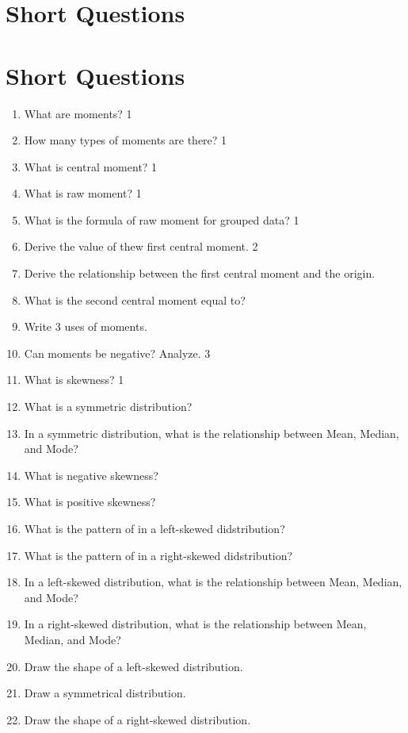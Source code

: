 \documentclass[a4paper,oneside]{book}
\begin{document}
\section{Short Questions}

\section{Short Questions}
\begin{enumerate}
    \item What are moments? \hfill 1
    \item How many types of moments are there?  \hfill 1
    \item What is central moment? \hfill 1
    \item  What is raw moment? \hfill 1
    \item  What is the formula of raw moment for grouped data? \hfill 1
    \item Derive the value of thew first central moment. \hfill 2
    \item  Derive the relationship between the first central moment and the origin.
    \item What is the second central moment equal to?
    \item Write 3 uses of moments.
    \item Can moments be negative? Analyze. \hfill 3
    \item What is skewness? \hfill 1
    \item What is a symmetric distribution?
    \item In a symmetric distribution, what is the relationship between Mean, Median, and Mode?
    \item What is negative skewness?
    \item What is positive skewness?
    \item What is the pattern of in a left-skewed didstribution?
    \item What is the pattern of in a right-skewed didstribution?
    \item In a left-skewed distribution, what is the relationship between Mean, Median, and Mode?
    \item In a right-skewed distribution, what is the relationship between Mean, Median, and Mode?
    \item Draw the shape of a left-skewed distribution.
    \item Draw a symmetrical distribution.  
    \item Draw the shape of a right-skewed distribution.

\end{enumerate}
\end{document}
